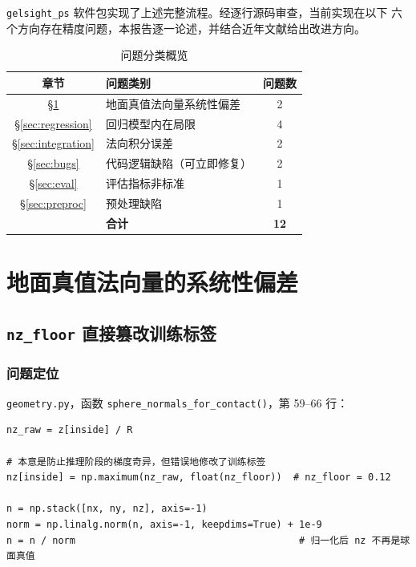 \documentclass[12pt, a4paper]{ctexart}
\begin{document}
\texttt{gelsight\_ps} 软件包实现了上述完整流程。经逐行源码审查，当前实现在以下
六个方向存在精度问题，本报告逐一论述，并结合近年文献给出改进方向。

\begin{table}[h]
  \centering
  \caption{问题分类概览}
  \label{tab:overview}
  \begin{tabular}{clc}
    \toprule
    \textbf{章节} & \textbf{问题类别} & \textbf{问题数} \\
    \midrule
    \S\ref{sec:gt_bias}    & 地面真值法向量系统性偏差   & 2 \\
    \S\ref{sec:regression} & 回归模型内在局限           & 4 \\
    \S\ref{sec:integration}& 法向积分误差               & 2 \\
    \S\ref{sec:bugs}       & 代码逻辑缺陷（可立即修复） & 2 \\
    \S\ref{sec:eval}       & 评估指标非标准             & 1 \\
    \S\ref{sec:preproc}    & 预处理缺陷                 & 1 \\
    \midrule
    & \textbf{合计} & \textbf{12} \\
    \bottomrule
  \end{tabular}
\end{table}

\section{地面真值法向量的系统性偏差}
\label{sec:gt_bias}

\subsection{\texttt{nz\_floor} 直接篡改训练标签}
\label{subsec:nz_floor}

\subsubsection*{问题定位}

\texttt{geometry.py}，函数 \texttt{sphere\_normals\_for\_contact()}，第 59--66 行：

\begin{lstlisting}[caption={\texttt{nz\_floor} 对训练标签的错误应用}]
nz_raw = z[inside] / R

# 本意是防止推理阶段的梯度奇异，但错误地修改了训练标签
nz[inside] = np.maximum(nz_raw, float(nz_floor))  # nz_floor = 0.12

n = np.stack([nx, ny, nz], axis=-1)
norm = np.linalg.norm(n, axis=-1, keepdims=True) + 1e-9
n = n / norm                                       # 归一化后 nz 不再是球面真值
\end{lstlisting}
\end{document}
